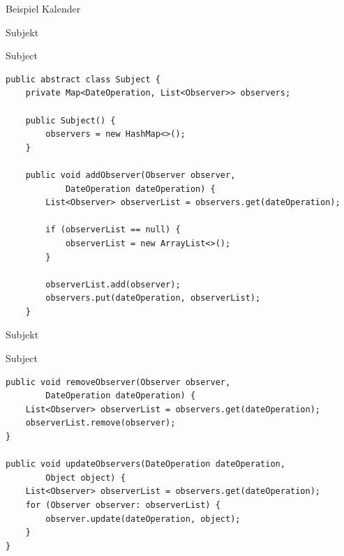 \begin{frame}{Beispiel Kalender}
\end{frame}

\begin{frame}[fragile]{Subjekt}
	\begin{exampleblock}{Subject}
 		\begin{lstlisting}
public abstract class Subject {
	private Map<DateOperation, List<Observer>> observers;
	
	public Subject() {
		observers = new HashMap<>();
	}
	
	public void addObserver(Observer observer, 
			DateOperation dateOperation) {
		List<Observer> observerList = observers.get(dateOperation);
		
		if (observerList == null) {
			observerList = new ArrayList<>();
		}
		
		observerList.add(observer);
		observers.put(dateOperation, observerList);
	}
 		\end{lstlisting}
 	\end{exampleblock}
\end{frame}

\begin{frame}[fragile]{Subjekt}
	\begin{exampleblock}{Subject}
 		\begin{lstlisting}
public void removeObserver(Observer observer, 
        DateOperation dateOperation) {
    List<Observer> observerList = observers.get(dateOperation);
    observerList.remove(observer);
}

public void updateObservers(DateOperation dateOperation,
        Object object) {
    List<Observer> observerList = observers.get(dateOperation);
    for (Observer observer: observerList) {
        observer.update(dateOperation, object);
    }
}
 		\end{lstlisting}
 	\end{exampleblock}
\end{frame}

